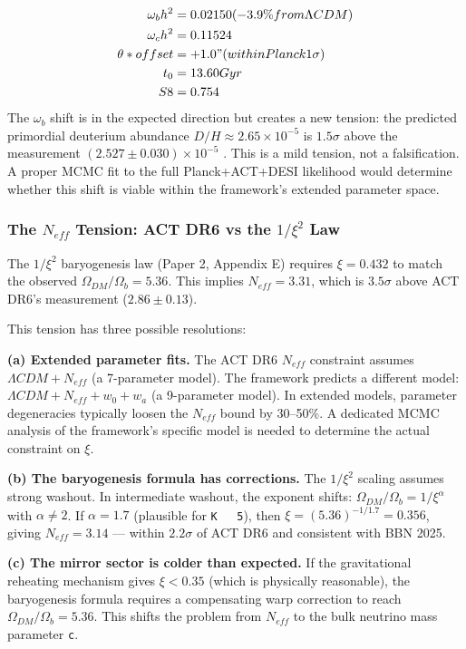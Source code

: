 \documentclass[aps,prd,preprint,superscriptaddress,longbibliography,floatfix]{revtex4-2}
\theoremstyle{remark}
\begin{document}
\begin{align}
    \omega_b h^{2} &= 0.02150  (-3.9\% from \Lambda CDM) \\
    \omega_c h^{2} &= 0.11524 \\
    \theta* offset &= +1.0"  (within Planck 1\sigma) \\
    t_{0} &= 13.60 Gyr \\
    S8 &= 0.754
\end{align}
The $\omega_b$ shift is in the expected direction but creates a new tension: the predicted primordial deuterium abundance $D/H \approx 2.65 \times 10^{-5}$ is $1.5\sigma$ above the measurement $(2.527 \pm 0.030) \times 10^{-5}$ \cite{Cooke2018_DH}. This is a mild tension, not a falsification. A proper MCMC fit to the full Planck+ACT+DESI likelihood would determine whether this shift is viable within the framework's extended parameter space.


\subsubsection{The $N_{eff}$ Tension: ACT DR6 vs the $1/\xi^{2}$ Law}

The $1/\xi^{2}$ baryogenesis law (Paper 2, Appendix E) requires $\xi = 0.432$ to match the observed $\Omega_{DM}/\Omega_b = 5.36$. This implies $N_{eff} = 3.31$, which is $3.5\sigma$ above ACT DR6's measurement ($2.86 \pm 0.13$).

This tension has three possible resolutions:

\textbf{(a) Extended parameter fits.} The ACT DR6 $N_{eff}$ constraint assumes $\Lambda CDM + N_{eff}$ (a 7-parameter model). The framework predicts a different model: $\Lambda CDM + N_{eff} + w_{0} + w_{a}$ (a 9-parameter model). In extended models, parameter degeneracies typically loosen the $N_{eff}$ bound by 30--50\%. A dedicated MCMC analysis of the framework's specific model is needed to determine the actual constraint on $\xi$.

\textbf{(b) The baryogenesis formula has corrections.} The $1/\xi^{2}$ scaling assumes strong washout. In intermediate washout, the exponent shifts: $\Omega_{DM}/\Omega_b = 1/\xi^\alpha$ with $\alpha \neq 2$. If $\alpha = 1.7$ (plausible for \texttt{K ~ 5}), then $\xi = (5.36)^{-1/1.7} = 0.356$, giving $N_{eff} = 3.14$ --- within $2.2\sigma$ of ACT DR6 and consistent with BBN 2025.

\textbf{(c) The mirror sector is colder than expected.} If the gravitational reheating mechanism gives $\xi < 0.35$ (which is physically reasonable), the baryogenesis formula requires a compensating warp correction to reach $\Omega_{DM}/\Omega_b = 5.36$. This shifts the problem from $N_{eff}$ to the bulk neutrino mass parameter \texttt{c}.
\end{document}
